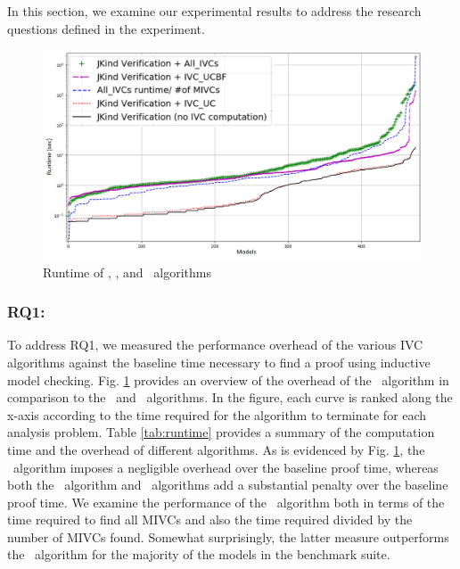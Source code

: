 

In this section, we examine our
experimental results to address the research questions defined in the experiment.

\begin{figure}[t]
 \centering
  \includegraphics[width=\textwidth]{figs/performance.jpg}
  \vspace{-0.2in}
  \caption{Runtime of \aivcalg, \ucbfalg, and \ucalg ~algorithms}
  \label{fig:performance}
\end{figure}

\subsubsection{RQ1:}

To address RQ1, we measured the performance overhead of the various IVC algorithms against the baseline time
necessary to find a proof using inductive model checking. Fig. \ref{fig:performance} provides an overview of the  overhead of the \aivcalg ~algorithm in comparison to the \ucalg ~and \ucbfalg\ algorithms.  In the figure, each curve is ranked along the x-axis according to the time required for the algorithm to terminate for each analysis problem.  Table \ref{tab:runtime} provides a summary of the computation time and the overhead of different algorithms.
  As is evidenced by Fig. \ref{fig:performance}, the \ucalg\  algorithm imposes a negligible overhead over the baseline proof time, whereas both the \ucbfalg\ algorithm and \aivcalg\ algorithms add a substantial penalty over the baseline proof time.
    We examine the performance of the \aivcalg\ algorithm both
     in terms of the time required to find all MIVCs and also the time required divided by the number of MIVCs found.  Somewhat surprisingly, the latter measure outperforms the \ucbfalg\ algorithm for the majority of the models in the benchmark suite.

